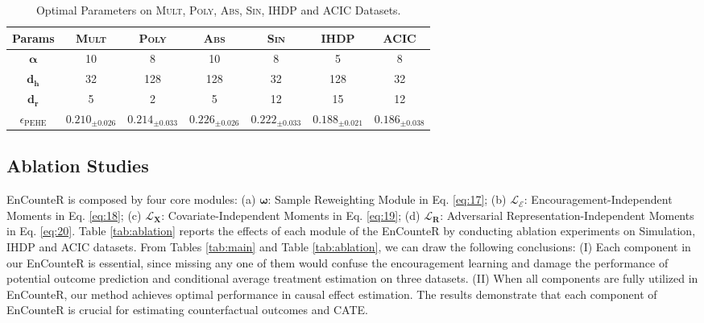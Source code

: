 \documentclass[journal]{IEEEtran}
\begin{document}
\begin{table}[th]
{
\caption{Optimal Parameters on \textsc{Mult}, \textsc{Poly}, \textsc{Abs}, \textsc{Sin}, \textsc{IHDP} and \textsc{ACIC} Datasets.}
\label{tab:params}
\begin{center}
\setlength{\tabcolsep}{3mm}
{
\begin{tabular}{c|c|c|c|c|c|c}
\toprule
Params & 
\textsc{Mult} &
\textsc{Poly} &
\textsc{Abs} &
\textsc{Sin} &
\textsc{IHDP} &
\textsc{ACIC} 
\\

\midrule

$\mathbf{ \alpha }$ & 
10 &
8 &
10 &
8 &
5 &
8 
\\

$ \mathbf{ d_h }$ & 
32 &
128 &
128 &
32 &
128 &
32 
\\

$ \mathbf{ d_r }$ & 
5 &
2 &
5 &
12 &
15 &
12 
\\

\midrule
\bf $\epsilon_{\text{PEHE}}$ & 
$ \mathbf{ 0.210_{\pm 0.026} } $  &
$ \mathbf{ 0.214_{\pm 0.033} } $  &
$ \mathbf{ 0.226_{\pm 0.026} } $ &
$ \mathbf{ 0.222_{\pm 0.033} } $  &
$ \mathbf{ 0.188_{\pm 0.021} } $ &
$ \mathbf{ 0.186_{\pm 0.038} } $
\\
 
\bottomrule
\end{tabular}
}
\end{center}
}
\end{table}

\subsection{Ablation Studies} 
EnCounteR is composed by four core modules: (a) $\boldsymbol{\omega}$: Sample Reweighting Module in Eq. \eqref{eq:17}; (b) $\boldsymbol{\mathcal{L}}_{\boldsymbol{\mathcal{E}}}$: Encouragement-Independent Moments in Eq. \eqref{eq:18}; (c) $\boldsymbol{\mathcal{L}}_{\boldsymbol{X}}$: Covariate-Independent Moments in Eq. \eqref{eq:19}; (d) $\boldsymbol{\mathcal{L}}_{\boldsymbol{R}}$: Adversarial Representation-Independent Moments in Eq. \eqref{eq:20}.
Table \ref{tab:ablation} reports the effects of each module of the EnCounteR by conducting ablation experiments on Simulation, IHDP and ACIC datasets.
From Tables \ref{tab:main} and Table \ref{tab:ablation}, we can draw the following conclusions: (I) Each component in our EnCounteR is essential, since missing any one of them would confuse the encouragement learning and damage the performance of potential outcome prediction and conditional average treatment estimation on three datasets. (II) When all components are fully utilized in EnCounteR, our method achieves optimal performance in causal effect estimation. The results demonstrate that each component of EnCounteR is crucial for estimating counterfactual outcomes and CATE.
\end{document}
